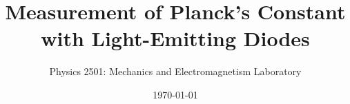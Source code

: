 \documentclass{revtex4}
\begin{document}

\title{Measurement of Planck's Constant with Light-Emitting Diodes}


\author{Physics 2501: Mechanics and Electromagnetism Laboratory}


\date{\today}



\setlength{\topmargin}{0in}

\maketitle

\end{document}
